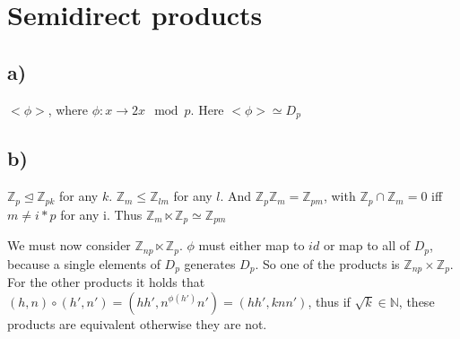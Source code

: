 \section{Semidirect products}

\subsection*{a)} 
$<\phi>$, where $\phi: x \rightarrow 2x \mod p$. Here $<\phi> \simeq D_p$

\subsection*{b)}
$\mathbb{Z}_p \trianglelefteq \mathbb{Z}_{pk}$ for any $k$. $\mathbb{Z}_m  \leq \mathbb{Z}_{lm}$ for any $l$. And $\mathbb{Z}_p\mathbb{Z}_m = \mathbb{Z}_{pm}$, with $\mathbb{Z}_p \cap \mathbb{Z}_m = {0}$ iff $m \neq i*p$ for any i. Thus $\mathbb{Z}_m \ltimes \mathbb{Z}_p \simeq \mathbb{Z}_{pm}$

We must now consider $\mathbb{Z}_{np} \ltimes \mathbb{Z}_p$. $\phi$ must either map to $id$ or map to all of $D_p$, because a single elements of $D_p$ generates $D_p$. So one of the products is $\mathbb{Z}_{np} \times \mathbb{Z}_p$. For the other products it holds that $(h,n)\circ(h',n')=(hh',n^{\phi(h')}n')=(hh',knn')$, thus if $\sqrt{k} \in \mathbb{N}$, these products are equivalent otherwise they are not.